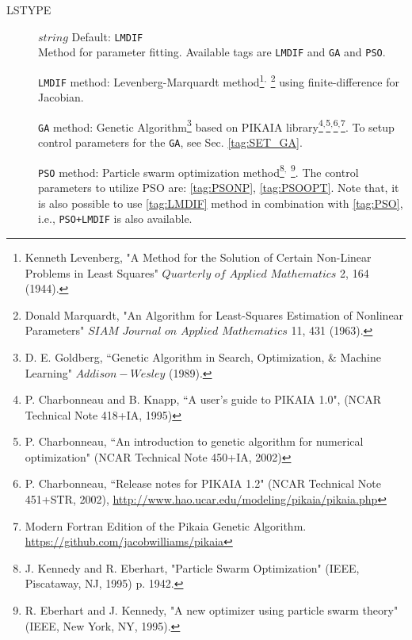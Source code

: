 \documentclass[a4paper,12pt]{scrartcl}
\makeatletter
\def\namedlabel#1#2{\begingroup
    #2%
    \def\@currentlabel{#2}%
    \phantomsection\label{#1}\endgroup
}
\newcommand{\textblue}[1]{\textcolor{blue!85!white}{\texttt{#1}}}
\makeatother
\begin{document}
\begin{description}

    \item[\namedlabel{tag:LSTYPE}{LSTYPE}] $string$ Default: \texttt{LMDIF}  \\
        Method for parameter fitting. Available tags are \texttt{LMDIF} and \texttt{GA} and \texttt{PSO}.
        
		\subitem \namedlabel{tag:LMDIF}{\texttt{LMDIF}} method: Levenberg-Marquardt method\footnote{ Kenneth Levenberg, 
		"A Method for the Solution of Certain Non-Linear Problems in Least Squares" 
		$Quarterly$ $of$ $Applied$ $Mathematics$ 2, 164 (1944).}$^,$
		\footnote{Donald Marquardt, "An Algorithm for Least-Squares Estimation of 
		Nonlinear Parameters" $SIAM$ $Journal$ $on$ $Applied$ $Mathematics$ 11, 
		431 (1963).} using finite-difference for Jacobian.
		
		\subitem \namedlabel{tag:GA}{\texttt{GA}} method: Genetic Algorithm\footnote{D. E. Goldberg, ``Genetic Algorithm in Search, Optimization, \& Machine Learning" $Addison-Wesley$ (1989).} based on PIKAIA library\footnote{P. Charbonneau and B. Knapp, ``A user's guide to PIKAIA 1.0", (NCAR Technical Note 418+IA, 1995)}$^,$\footnote{P. Charbonneau, ``An introduction to genetic algorithm for numerical optimization" (NCAR Technical Note 450+IA, 2002)}$^,$\footnote{P. Charbonneau, ``Release notes for PIKAIA 1.2" (NCAR Technical Note 451+STR, 2002), \href{http://www.hao.ucar.edu/modeling/pikaia/pikaia.php}{http://www.hao.ucar.edu/modeling/pikaia/pikaia.php}}$^,$\footnote{Modern Fortran Edition of the Pikaia Genetic Algorithm. \href{https://github.com/jacobwilliams/pikaia}{https://github.com/jacobwilliams/pikaia}}. To setup control parameters for the \texttt{GA}, see Sec. \ref{tag:SET_GA}.
		
		\subitem \namedlabel{tag:PSO}{\texttt{PSO}} method: Particle swarm optimization method\footnote{J. Kennedy and R. Eberhart, "Particle Swarm Optimization" (IEEE, Piscataway, NJ, 1995) p. 1942.}$^,$ \footnote{ R. Eberhart and J. Kennedy, "A new optimizer using particle swarm theory"	(IEEE, New York, NY, 1995).}. The control parameters to utilize PSO are: \ref{tag:PSONP}, \ref{tag:PSOOPT}. Note that, it is also possible to use \ref{tag:LMDIF} method in combination with \ref{tag:PSO}, i.e.,  \namedlabel{tag:PSOLMDIF}{\textblue{PSO+LMDIF}} is also available.
			

\end{description}
\end{document}
